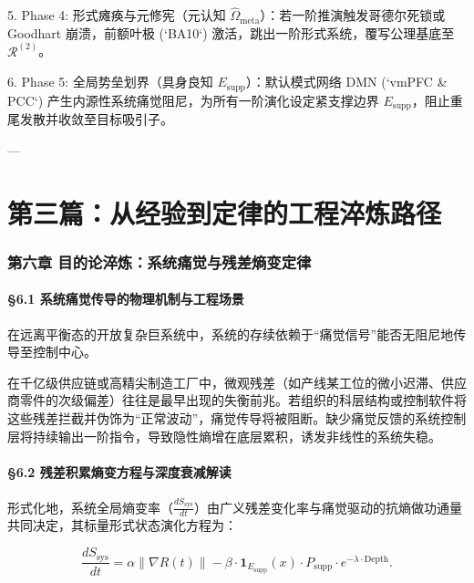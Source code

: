 \documentclass[11pt,a4paper,oneside]{ctexart}
\begin{document}
5. \textit{}Phase 4: 形式瘫痪与元修宪（元认知 $\hat{\Omega}_{\text{meta}}$）\textit{}：若一阶推演触发哥德尔死锁或 Goodhart 崩溃，前额叶极 (`BA10`) 激活，跳出一阶形式系统，覆写公理基底至 $\mathcal{R}^{(2)}$。

6. \textit{}Phase 5: 全局势垒划界（具身良知 $E_{\text{supp}}$）\textit{}：默认模式网络 DMN (`vmPFC \& PCC`) 产生内源性系统痛觉阻尼，为所有一阶演化设定紧支撑边界 $E_{\text{supp}}$，阻止重尾发散并收敛至目标吸引子。


---


\part{第三篇：从经验到定律的工程淬炼路径}

\section{第六章 目的论淬炼：系统痛觉与残差熵变定律}

\subsection{§6.1 系统痛觉传导的物理机制与工程场景}

在远离平衡态的开放复杂巨系统中，系统的存续依赖于“痛觉信号”能否无阻尼地传导至控制中心。


在千亿级供应链或高精尖制造工厂中，微观残差（如产线某工位的微小迟滞、供应商零件的次级偏差）往往是最早出现的失衡前兆。若组织的科层结构或控制软件将这些残差拦截并伪饰为“正常波动”，痛觉传导将被阻断。缺少痛觉反馈的系统控制层将持续输出一阶指令，导致隐性熵增在底层累积，诱发非线性的系统失稳。


\subsection{§6.2 残差积累熵变方程与深度衰减解读}

形式化地，系统全局熵变率（$\frac{d S_{\text{sys}}}{dt}$）由广义残差变化率与痛觉驱动的抗熵做功通量共同决定，其标量形式状态演化方程为：


\begin{equation}
\frac{d S_{\text{sys}}}{dt} = \alpha \|\nabla R(t)\| - \beta \cdot \mathbf{1}_{E_{\text{supp}}}(x) \cdot P_{\text{supp}} \cdot e^{-\lambda \cdot \text{Depth}}.
\end{equation}
\end{document}
